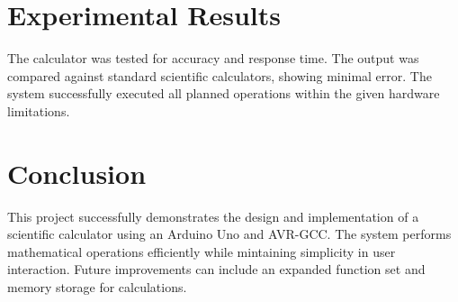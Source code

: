 \documentclass[12pt,a4paper]{article}
\begin{document}
\section{Experimental Results}
The calculator was tested for accuracy and response time. The output was compared against standard scientific calculators, showing minimal error. The system successfully executed all planned operations within the given hardware limitations.

\section{Conclusion}
This project successfully demonstrates the design and implementation of a scientific calculator using an Arduino Uno and AVR-GCC. The system performs mathematical operations efficiently while mintaining simplicity in user interaction. Future improvements can include an expanded function set and memory storage for calculations.
\end{document}
